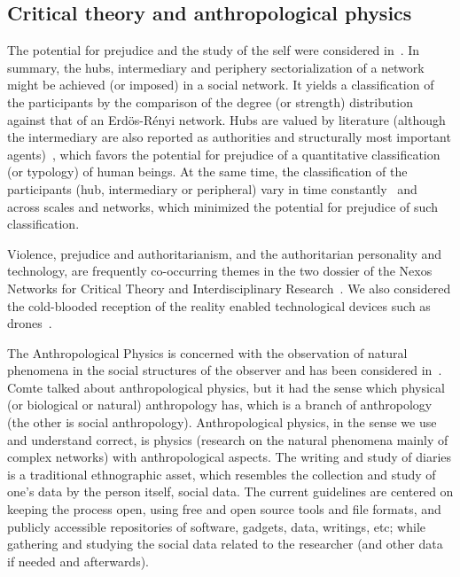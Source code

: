 \documentclass[letterpaper,10pt]{article}
\begin{document}
\subsection{Critical theory and anthropological physics}\label{exp}
The potential for prejudice and the study of the self
were considered in~\cite{imp,stab,tese}.
In summary, the hubs, intermediary and periphery sectorialization
of a network might be achieved (or imposed) in a social network.
It yields a classification of the participants
by the comparison of the degree (or strength) distribution
against that of an Erdös-Rényi network.
Hubs are valued by literature
(although the intermediary are also reported as authorities
and structurally most important agents)~\cite{ega},
which favors the potential for prejudice
of a quantitative classification (or typology)
of human beings.
At the same time, the classification of the participants
(hub, intermediary or peripheral)
vary in time constantly~\cite{stab,tese}
and across scales and networks,
which minimized the potential
for prejudice of such classification.

Violence, prejudice and authoritarianism,
and the authoritarian personality and technology,
are frequently co-occurring themes in the two dossier of the
Nexos Networks for Critical Theory and Interdisciplinary Research~\cite{nexos1}.
We also considered the cold-blooded reception of the reality
enabled technological devices such as drones~\cite{drones}.

The Anthropological Physics is concerned
with the observation of natural
phenomena in the social structures
of the observer and has been
considered in~\cite{an,an2,tese}.
Comte talked about anthropological physics,
but it had the sense which physical (or biological or natural)
anthropology has, which is a branch of anthropology
(the other is social anthropology).
Anthropological physics, in the sense we use and understand correct,
is physics (research on the natural phenomena mainly of complex networks)
with anthropological aspects.
The writing and study of diaries is a traditional ethnographic asset,
which resembles the collection and study of one's data by the person itself,
social data.
The current guidelines are centered on keeping the process open,
using free and open source tools and file formats,
and publicly accessible repositories of software, gadgets, data, writings, etc;
while gathering and studying the social data related to the researcher
(and other data if needed and afterwards).~\cite{an,an2,imp,tese}
\end{document}
